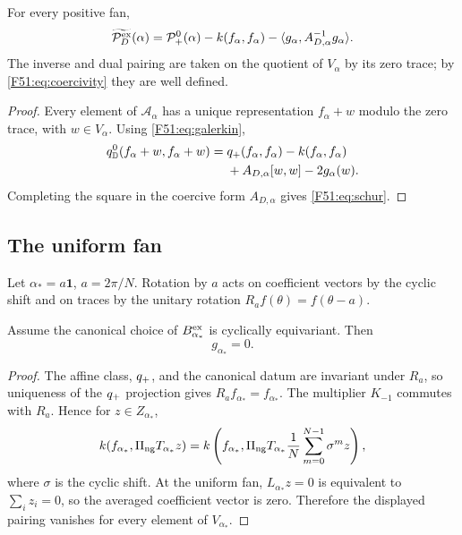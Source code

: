 \begin{theorem}\label{F51:thm:schur}
For every positive fan,
\begin{equation}\label{F51:eq:schur}
 \widetilde{\mathcal P_D^{\rm ex}}(\alpha)
 =\mathcal P_+^0(\alpha)-k(f_\alpha,f_\alpha)
 -\langle g_\alpha,A_{D,\alpha}^{-1}g_\alpha\rangle.
\end{equation}
The inverse and dual pairing are taken on the quotient of $V_\alpha$ by its
zero trace; by \eqref{F51:eq:coercivity} they are well defined.
\end{theorem}

\begin{proof}
Every element of $\mathcal A_\alpha$ has a unique representation
$f_\alpha+w$ modulo the zero trace, with $w\in V_\alpha$.  Using
\eqref{F51:eq:galerkin},
\begin{align*}
 q_{\mathbb D}^{0}(f_\alpha+w,f_\alpha+w)
 ={}&q_+(f_\alpha,f_\alpha)-k(f_\alpha,f_\alpha)\\
 &+A_{D,\alpha}[w,w]-2g_\alpha(w).
\end{align*}
Completing the square in the coercive form $A_{D,\alpha}$ gives
\eqref{F51:eq:schur}.
\end{proof}

\subsection{The uniform fan}

Let $\alpha_*=a\mathbf1$, $a=2\pi/N$.  Rotation by $a$ acts on coefficient
vectors by the cyclic shift and on traces by the unitary rotation
$R_af(\theta)=f(\theta-a)$.

\begin{lemma}\label{F51:lem:gzero}
Assume the canonical choice of $B_{\alpha_*}^{\rm ex}$ is cyclically
equivariant.  Then
\begin{equation}\label{F51:eq:gzero}
 g_{\alpha_*}=0.
\end{equation}
\end{lemma}

\begin{proof}
The affine class, $q_+$, and the canonical datum are invariant under
$R_a$, so uniqueness of the $q_+$ projection gives
$R_af_{\alpha_*}=f_{\alpha_*}$.  The multiplier $K_{-1}$ commutes with
$R_a$.  Hence for $z\in Z_{\alpha_*}$,
\begin{equation}
 k(f_{\alpha_*},\Pi_{\rm ng} T_{\alpha_*}z)
 =k\left(f_{\alpha_*},\Pi_{\rm ng} T_{\alpha_*}
 \frac1N\sum_{m=0}^{N-1}\sigma^m z\right),
\end{equation}
where $\sigma$ is the cyclic shift.  At the uniform fan,
$L_{\alpha_*}z=0$ is equivalent to $\sum_i z_i=0$, so the averaged
coefficient vector is zero.  Therefore the displayed pairing vanishes for
every element of $V_{\alpha_*}$.
\end{proof}


